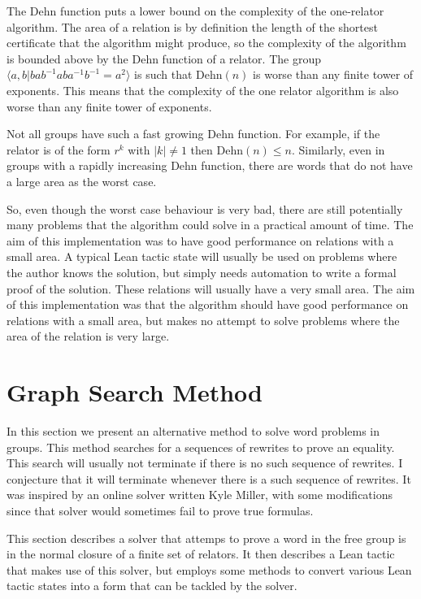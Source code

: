 \documentclass[12pt]{article} %
\theoremstyle{definition}
\theoremstyle{definition}
\theoremstyle{definition}
\theoremstyle{definition}
\theoremstyle{definition}
\theoremstyle{definition}
\begin{document}
  The Dehn function puts a lower bound on the complexity of the one-relator algorithm.
  The area of a relation is by definition the length of the shortest certificate
  that the algorithm might produce, so the complexity of the algorithm is bounded above by
  the Dehn function of a relator.
  The group $\langle a, b | b a b^{-1} a b a^{-1} b^{-1} = a^2\rangle$ is such that
  $\text{Dehn}(n)$ is worse than any finite tower of exponents. This means that the
  complexity of the one relator algorithm is also worse than any finite tower of
  exponents.

  Not all groups have such a fast growing Dehn function. For example, if the relator
  is of the form $r^k$ with $|k| \ne 1$ then $\text{Dehn}(n) \le n$.
  Similarly, even in groups with a rapidly increasing Dehn function,
  there are words that do not have a large area as the worst case.

  So, even though the worst case behaviour is very bad, there are still potentially many
  problems that the algorithm could solve in a practical amount of time. The aim of this
  implementation was to have good performance on relations with a small area.
  A typical Lean tactic state will usually be used on problems where the author knows
  the solution, but simply needs automation to write a formal proof of the solution.
  These relations will usually have a very small area. The aim of this implementation
  was that the algorithm should have good performance on relations with a small area,
  but makes no attempt to solve problems where the area of the relation is very large.

\section{Graph Search Method}

  In this section we present an alternative method to solve word problems in groups.
  This method searches for a sequences of rewrites to prove an equality. This search will
  usually not terminate if there is no such sequence of rewrites. I conjecture that it
  will terminate whenever there is a such sequence of rewrites. It was inspired by an
  online solver written Kyle Miller, with some modifications since that solver
  would sometimes fail to prove true formulas.

  This section describes a solver that attemps to prove a word in the free group
  is in the normal closure of a finite set of relators. It then describes
  a Lean tactic that makes use of this solver, but employs some methods
  to convert various Lean tactic states into a form that can be tackled by
  the solver.
\end{document}
